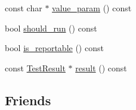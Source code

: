 \begin{DoxyCompactItemize}
\item 
const char $\ast$ \hyperlink{classtesting_1_1_test_info_a9671fbc0effcb32e98803888dc166a66}{value\-\_\-param} () const 
\item 
bool \hyperlink{classtesting_1_1_test_info_a240c9fb051d7b0586ed380c6b4e729e4}{should\-\_\-run} () const 
\item 
bool \hyperlink{classtesting_1_1_test_info_a7ad90aeebb1d6fe3a43c6e3e3427e382}{is\-\_\-reportable} () const 
\item 
const \hyperlink{classtesting_1_1_test_result}{Test\-Result} $\ast$ \hyperlink{classtesting_1_1_test_info_addea8766df3b8abe4cc4103218a49a65}{result} () const 
\end{DoxyCompactItemize}
\subsection*{Friends}
